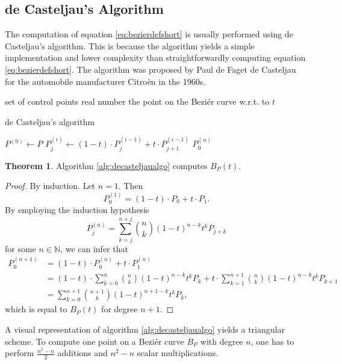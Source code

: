 \documentclass[a4paper, 11pt]{report}
\theoremstyle{definition}
\newtheorem{theorem}[definition]{Theorem}
\newcommand{\Desc}[2]{\State \makebox[12em][l]{#1}#2}
\begin{document}
\subsection{de Casteljau's Algorithm}

The computation of equation \ref{eq:bezierdefshort} is usually performed using de Casteljau's algorithm. This is because the algorithm yields a simple implementation and lower complexity than straightforwardly computing equation \ref{eq:bezierdefshort}. The algorithm was proposed by Paul de Faget de Casteljau for the automobile manufacturer Citroën in the 1960s.

\begin{algorithm}
	\begin{algorithmic}[1]
		\Input
			\Desc{$P = \{P_0, P_1, ..., P_n\}$}{set of control points}
			\Desc{$t$}{real number}
		\EndInput
		\Output
			\Desc{$P^{(n)}_0 = B_P(t)$}{the point on the Beziér curve w.r.t. to $t$}
		\EndOutput

		\caption{de Casteljau's algorithm}\label{alg:decasteljaualgo}
			\State $P^{(0)} \gets P$
					\State $P^{(i)}_j \gets (1-t) \cdot P^{(i-1)}_j + t \cdot P^{(i-1)}_{j+1}$
				\EndFor
			\EndFor
			\Return $P^{(n)}_0$
		\EndProcedure
	\end{algorithmic}
\end{algorithm}

\begin{theorem}
	Algorithm \ref{alg:decasteljaualgo} computes $B_P(t)$.
\end{theorem}
\begin{proof}
	By induction. Let $n = 1$. Then
		$$ P_0^{(1)} = (1-t) \cdot P_0 + t \cdot P_1.$$
	By employing the induction hypothesis
		$$ P_j^{(n)} = \sum_{k=j}^{n+j} \binom{n}{k} (1-t)^{n-k}t^k P_{j+k}$$
	for some $n \in \mathbb{N}$, we can infer that
	\begin{align*}
		P_0^{(n+1)}	&= (1-t) \cdot P_0^{(n)} + t \cdot P_1^{(n)} \\
					&= (1-t) \cdot \sum_{k=0}^{n} \binom{n}{k} (1-t)^{n-k}t^k P_{k} + t \cdot \sum_{k=1}^{n+1} \binom{n}{k} (1-t)^{n-k}t^k P_{k+1} \\
					&= \sum_{k=0}^{n+1} \binom{n+1}{k} (1-t)^{n+1-k}t^k P_{k},
	\end{align*}
	which is equal to $B_P(t)$ for degree $n+1$.
\end{proof}

A visual representation of algorithm \ref{alg:decasteljaualgo} yields a triangular scheme. To compute one point on a Beziér curve $B_P$ with degree $n$, one has to perform $\frac{n^2-n}{2}$ additions and $n^2-n$ scalar multiplications.
\end{document}
